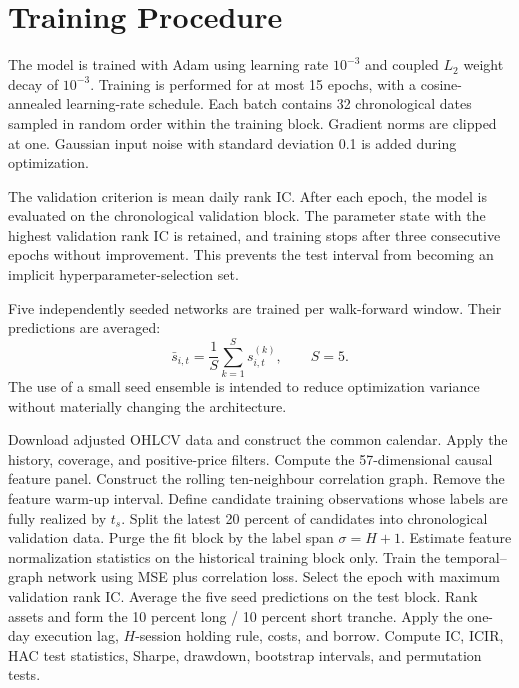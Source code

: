 \documentclass[10pt]{article}
\begin{document}
\section{Training Procedure}

The model is trained with Adam using learning rate $10^{-3}$ and coupled $L_2$ weight decay of $10^{-3}$. Training is performed for at most 15 epochs, with a cosine-annealed learning-rate schedule. Each batch contains 32 chronological dates sampled in random order within the training block. Gradient norms are clipped at one. Gaussian input noise with standard deviation 0.1 is added during optimization.

The validation criterion is mean daily rank IC. After each epoch, the model is evaluated on the chronological validation block. The parameter state with the highest validation rank IC is retained, and training stops after three consecutive epochs without improvement. This prevents the test interval from becoming an implicit hyperparameter-selection set.

Five independently seeded networks are trained per walk-forward window. Their predictions are averaged:
\begin{equation}
\bar s_{i,t}
=
\frac{1}{S}
\sum_{k=1}^{S}s_{i,t}^{(k)},
\qquad S=5.
\end{equation}
The use of a small seed ensemble is intended to reduce optimization variance without materially changing the architecture.

\begin{algorithm}[tbp]
\caption{Leak-free walk-forward RAN evaluation}
\begin{algorithmic}[1]
\State Download adjusted OHLCV data and construct the common calendar.
\State Apply the history, coverage, and positive-price filters.
\State Compute the 57-dimensional causal feature panel.
\State Construct the rolling ten-neighbour correlation graph.
\State Remove the feature warm-up interval.
        \State Define candidate training observations whose labels are fully realized by $t_s$.
        \State Split the latest 20 percent of candidates into chronological validation data.
        \State Purge the fit block by the label span $\sigma=H+1$.
        \State Estimate feature normalization statistics on the historical training block only.
            \State Train the temporal--graph network using MSE plus correlation loss.
            \State Select the epoch with maximum validation rank IC.
        \EndFor
        \State Average the five seed predictions on the test block.
        \State Rank assets and form the 10 percent long / 10 percent short tranche.
        \State Apply the one-day execution lag, $H$-session holding rule, costs, and borrow.
    \EndFor
    \State Compute IC, ICIR, HAC test statistics, Sharpe, drawdown, bootstrap intervals, and permutation tests.
\EndFor
\end{algorithmic}
\end{algorithm}
\end{document}
